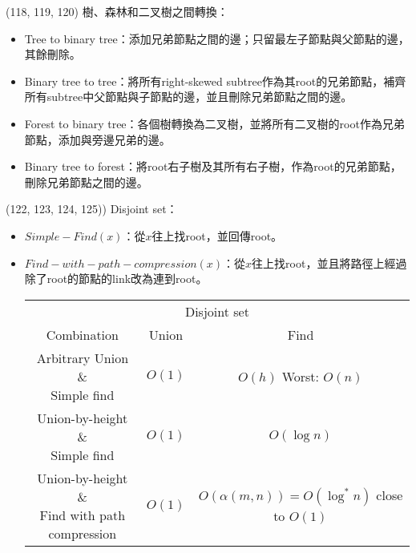 \item \begin{theorem}{(118, 119, 120)} 樹、森林和二叉樹之間轉換：\begin{itemize}
        \item Tree to binary tree：添加兄弟節點之間的邊；只留最左子節點與父節點的邊，其餘刪除。
        \item Binary tree to tree：將所有right-skewed subtree作為其root的兄弟節點，補齊所有subtree中父節點與子節點的邊，並且刪除兄弟節點之間的邊。
        \item Forest to binary tree：各個樹轉換為二叉樹，並將所有二叉樹的root作為兄弟節點，添加與旁邊兄弟的邊。
        \item Binary tree to forest：將root右子樹及其所有右子樹，作為root的兄弟節點，刪除兄弟節點之間的邊。
    \end{itemize}
\end{theorem}

\item \begin{theorem}{(122, 123, 124, 125))} Disjoint set： \begin{itemize}
        \item $Simple-Find(x)$：從$x$往上找root，並回傳root。
        \item $Find-with-path-compression(x)$：從$x$往上找root，並且將路徑上經過除了root的節點的link改為連到root。
        \begin{table}[H]
            \centering
            \begin{tabular}{|c|c|c|}
                \hline
                \multicolumn{3}{|c|}{Disjoint set} \\
                \Xhline{3\arrayrulewidth}
                Combination & Union & Find \\
                \Xhline{2\arrayrulewidth}
                \makecell{Arbitrary Union \&\\Simple find} & $O(1)$ & \makecell{$O(h)$\\Worst: $O(n)$} \\
                \hline
                \makecell{Union-by-height \&\\Simple find} & $O(1)$ & $O(\log n)$ \\
                \hline
                \makecell{Union-by-height \&\\Find with path compression} & $O(1)$ & \makecell{$O(\alpha(m, n)) = O(\log^* n)$\\close to $O(1)$} \\
                \hline
            \end{tabular}
        \end{table}
    \end{itemize}
\end{theorem}
